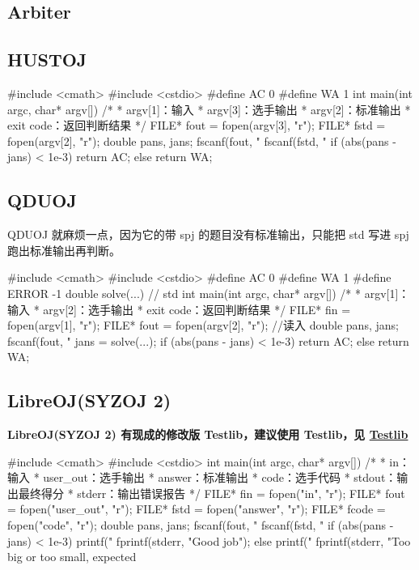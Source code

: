 \subsection{Arbiter}

\subsection{HUSTOJ}

\begin{cppcode}
#include <cmath>
#include <cstdio>
#define AC 0
#define WA 1
int main(int argc, char* argv[]) {
  /*
   * argv[1]：输入
   * argv[3]：选手输出
   * argv[2]：标准输出
   * exit code：返回判断结果
   */
  FILE* fout = fopen(argv[3], "r");
  FILE* fstd = fopen(argv[2], "r");
  double pans, jans;
  fscanf(fout, "%
  fscanf(fstd, "%
  if (abs(pans - jans) < 1e-3)
    return AC;
  else
    return WA;
}
\end{cppcode}

\subsection{QDUOJ}

QDUOJ 就麻烦一点，因为它的带 spj 的题目没有标准输出，只能把 std 写进 spj 跑出标准输出再判断。

\begin{cppcode}
#include <cmath>
#include <cstdio>
#define AC 0
#define WA 1
#define ERROR -1
double solve(...) {
  // std
}
int main(int argc, char* argv[]) {
  /*
   * argv[1]：输入
   * argv[2]：选手输出
   * exit code：返回判断结果
   */
  FILE* fin = fopen(argv[1], "r");
  FILE* fout = fopen(argv[2], "r");
  //读入
  double pans, jans;
  fscanf(fout, "%
  jans = solve(...);
  if (abs(pans - jans) < 1e-3)
    return AC;
  else
    return WA;
}
\end{cppcode}

\subsection{LibreOJ(SYZOJ 2)}

\textbf{LibreOJ(SYZOJ 2) 有现成的修改版 Testlib，建议使用 Testlib，见 \href{#testlib}{Testlib}}

\begin{cppcode}
#include <cmath>
#include <cstdio>
int main(int argc, char* argv[]) {
  /*
   * in：输入
   * user_out：选手输出
   * answer：标准输出
   * code：选手代码
   * stdout：输出最终得分
   * stderr：输出错误报告
   */
  FILE* fin = fopen("in", "r");
  FILE* fout = fopen("user_out", "r");
  FILE* fstd = fopen("answer", "r");
  FILE* fcode = fopen("code", "r");
  double pans, jans;
  fscanf(fout, "%
  fscanf(fstd, "%
  if (abs(pans - jans) < 1e-3) {
    printf("%
    fprintf(stderr, "Good job");
  } else {
    printf("%
    fprintf(stderr, "Too big or too small, expected %
  }
}
\end{cppcode}
